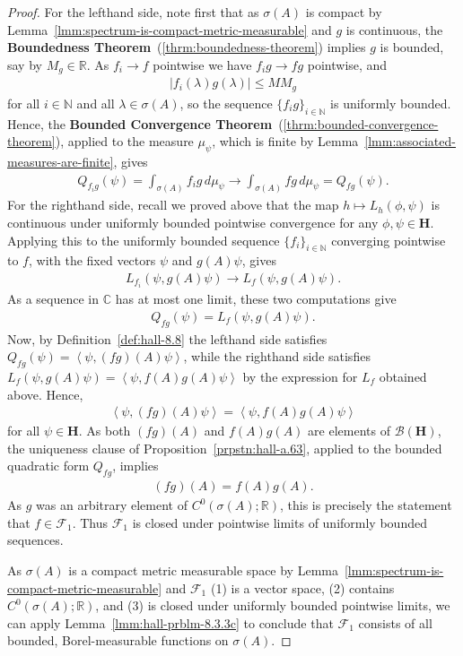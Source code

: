 \begin{proof}
For the lefthand side, note first that as $\sigma(A)$ is compact by Lemma~\ref{lmm:spectrum-is-compact-metric-measurable} and $g$ is continuous, the \textbf{Boundedness Theorem}~(\ref{thrm:boundedness-theorem}) implies $g$ is bounded, say by $M_g \in \mathbb{R}$. As $f_i \rightarrow f$ pointwise we have $f_i g \rightarrow fg$ pointwise, and
\begin{align}
    \lvert f_i(\lambda) g(\lambda) \rvert \le M M_g
\end{align}
for all $i \in \mathbb{N}$ and all $\lambda \in \sigma(A)$, so the sequence $\{ f_i g \}_{i \in \mathbb{N}}$ is uniformly bounded. Hence, the \textbf{Bounded Convergence Theorem}~(\ref{thrm:bounded-convergence-theorem}), applied to the measure $\mu_\psi$, which is finite by Lemma~\ref{lmm:associated-measures-are-finite}, gives 
\begin{align}
    Q_{f_i g}(\psi) = \int_{\sigma(A)} f_i g \, d\mu_\psi \longrightarrow \int_{\sigma(A)} fg \, d\mu_\psi = Q_{fg}(\psi).
\end{align}
For the righthand side, recall we proved above that the map $h \mapsto L_h(\phi, \psi)$ is continuous under uniformly bounded pointwise convergence for any $\phi, \psi \in \mathbf{H}$. Applying this to the uniformly bounded sequence $\{ f_i \}_{i \in \mathbb{N}}$ converging pointwise to $f$, with the fixed vectors $\psi$ and $g(A)\psi$, gives
\begin{align}
    L_{f_i}(\psi, g(A)\psi) \longrightarrow L_f(\psi, g(A)\psi).
\end{align}
As a sequence in $\mathbb{C}$ has at most one limit, these two computations give
\begin{align}
    Q_{fg}(\psi) = L_f(\psi, g(A)\psi).
\end{align}
Now, by Definition~\ref{def:hall-8.8} the lefthand side satisfies $Q_{fg}(\psi) = \left< \psi, (fg)(A)\psi \right>$, while the righthand side satisfies $L_f(\psi, g(A)\psi) = \left< \psi, f(A)g(A)\psi \right>$ by the expression for $L_f$ obtained above. Hence,
\begin{align}
    \left< \psi, (fg)(A)\psi \right> = \left< \psi, f(A)g(A)\psi \right>
\end{align}
for all $\psi \in \mathbf{H}$. As both $(fg)(A)$ and $f(A)g(A)$ are elements of $\mathcal{B}(\mathbf{H})$, the uniqueness clause of Proposition~\ref{prpstn:hall-a.63}, applied to the bounded quadratic form $Q_{fg}$, implies
\begin{align}
    (fg)(A) = f(A)g(A).
\end{align}
As $g$ was an arbitrary element of $C^0(\sigma(A); \mathbb{R})$, this is precisely the statement that $f \in \mathcal{F}_1$. Thus $\mathcal{F}_1$ is closed under pointwise limits of uniformly bounded sequences.

As $\sigma(A)$ is a compact metric measurable space by Lemma~\ref{lmm:spectrum-is-compact-metric-measurable} and $\mathcal{F}_1$ (1) is a vector space, (2) contains $C^0(\sigma(A); \mathbb{R})$, and (3) is closed under uniformly bounded pointwise limits, we can apply Lemma~\ref{lmm:hall-prblm-8.3.3c} to conclude that $\mathcal{F}_1$ consists of all bounded, Borel-measurable functions on $\sigma(A)$.
\end{proof}

